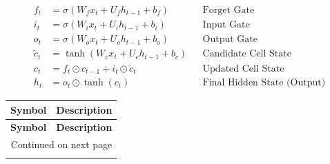 \begin{align*}
    f_t &= \sigma(W_f x_t + U_f h_{t-1} + b_f) && \text{Forget Gate} \\
    i_t &= \sigma(W_i x_t + U_i h_{t-1} + b_i) && \text{Input Gate} \\
    o_t &= \sigma(W_o x_t + U_o h_{t-1} + b_o) && \text{Output Gate} \\
    \tilde{c}_t &= \tanh(W_c x_t + U_c h_{t-1} + b_c) && \text{Candidate Cell State} \\
    c_t &= f_t \odot c_{t-1} + i_t \odot \tilde{c}_t && \text{Updated Cell State} \\
    h_t &= o_t \odot \tanh(c_t) && \text{Final Hidden State (Output)}
\end{align*}

\begin{center}
\begin{longtable}{|c|p{}|}
\hline
\textbf{Symbol} & \textbf{Description} \\
\hline
\endfirsthead

\hline
\textbf{Symbol} & \textbf{Description} \\
\hline
\endhead

\hline
\multicolumn{2}{|r|}{{Continued on next page}} \\
\hline
\endfoot

\hline
\endlastfoot


\end{longtable}
\end{center}
